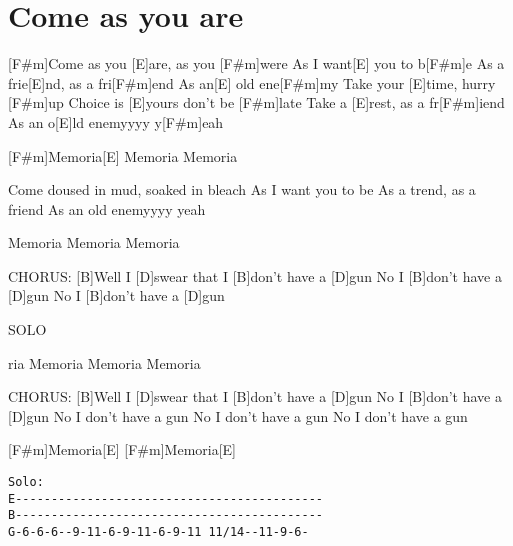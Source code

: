 \section{Come as you are}
\begin{multicols}{2}
\begin{guitar}

[F#m]Come as you [E]are, as you [F#m]were
As I want[E] you to b[F#m]e
As a frie[E]nd, as a fri[F#m]end
As an[E] old ene[F#m]my
Take your [E]time, hurry [F#m]up
Choice is [E]yours don't be [F#m]late
Take a [E]rest, as a fr[F#m]iend
As an o[E]ld enemyyyy y[F#m]eah

[F#m]Memoria[E]{}
Memoria
Memoria

Come doused in mud, soaked in bleach
As I want you to be
As a trend, as a friend
As an old enemyyyy yeah

Memoria
Memoria
Memoria


CHORUS:
[B]Well I [D]swear that I [B]don't have a [D]gun
No I [B]don't have a [D]gun
No I [B]don't have a [D]gun


SOLO


ria
Memoria
Memoria
Memoria


CHORUS:
[B]Well I [D]swear that I [B]don't have a [D]gun
No I [B]don't have a [D]gun
No I don't have a gun
No I don't have a gun
No I don't have a gun


[F#m]Memoria[E]{}
[F#m]Memoria[E]{}


\begin{verbatim}    
Solo:
E-------------------------------------------
B-------------------------------------------
G-6-6-6--9-11-6-9-11-6-9-11 11/14--11-9-6-          
\end{verbatim}
\end{guitar}
\end{multicols}
